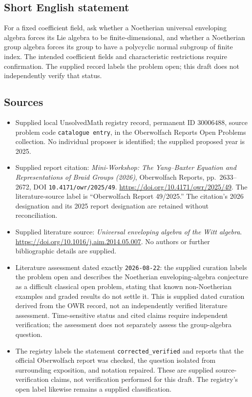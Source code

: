 \documentclass[11pt]{article}
\begin{document}
\subsection{Short English statement}
For a fixed coefficient field, ask whether a Noetherian universal enveloping algebra forces its Lie algebra to be finite-dimensional, and whether a Noetherian group algebra forces its group to have a polycyclic normal subgroup of finite index. The intended coefficient fields and characteristic restrictions require confirmation. The supplied record labels the problem open; this draft does not independently verify that status.
\subsection{Sources}
\begin{itemize}
\item Supplied local UnsolvedMath registry record, permanent ID \(30006488\), source problem code \texttt{catalogue entry}, in the Oberwolfach Reports Open Problems collection. No individual proposer is identified; the supplied proposed year is 2025.
\item Supplied report citation: \emph{Mini-Workshop: The Yang--Baxter Equation and Representations of Braid Groups (2026)}, Oberwolfach Reports, pp.~2633--2672, DOI \texttt{10.4171/owr/2025/49}. \url{https://doi.org/10.4171/owr/2025/49}. The literature-source label is ``Oberwolfach Report 49/2025.'' The citation's 2026 designation and its 2025 report designation are retained without reconciliation.
\item Supplied literature source: \emph{Universal enveloping algebra of the Witt algebra}. \url{https://doi.org/10.1016/j.aim.2014.05.007}. No authors or further bibliographic details are supplied.
\item Literature assessment dated exactly \texttt{2026-08-22}: the supplied curation labels the problem open and describes the Noetherian enveloping-algebra conjecture as a difficult classical open problem, stating that known non-Noetherian examples and graded results do not settle it. This is supplied dated curation derived from the OWR record, not an independently verified literature assessment. Time-sensitive status and cited claims require independent verification; the assessment does not separately assess the group-algebra question.
\item The registry labels the statement \texttt{corrected\_verified} and reports that the official Oberwolfach report was checked, the question isolated from surrounding exposition, and notation repaired. These are supplied source-verification claims, not verification performed for this draft. The registry's open label likewise remains a supplied classification.
\end{itemize}
\end{document}
